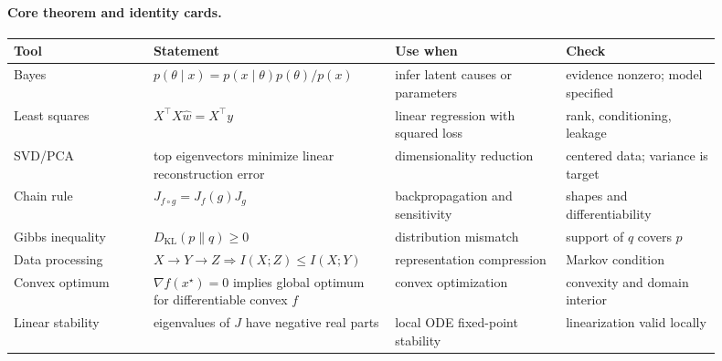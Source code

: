\paragraph{Core theorem and identity cards.}
\begin{center}
\small
\setlength{\tabcolsep}{2pt}
\renewcommand{\arraystretch}{1.12}
\begin{tabular}{p{0.18\linewidth}p{0.30\linewidth}p{0.22\linewidth}p{0.20\linewidth}}
\toprule
Tool & Statement & Use when & Check \\
\midrule
Bayes & \(p(\theta\mid x)=p(x\mid\theta)p(\theta)/p(x)\) & infer latent causes or parameters & evidence nonzero; model specified \\
Least squares & \(X^\top X\widehat w=X^\top y\) & linear regression with squared loss & rank, conditioning, leakage \\
SVD/PCA & top eigenvectors minimize linear reconstruction error & dimensionality reduction & centered data; variance is target \\
Chain rule & \(J_{f\circ g}=J_f(g)J_g\) & backpropagation and sensitivity & shapes and differentiability \\
Gibbs inequality & \(D_{\mathrm{KL}}(p\|q)\geq0\) & distribution mismatch & support of \(q\) covers \(p\) \\
Data processing & \(X\to Y\to Z\Rightarrow I(X;Z)\leq I(X;Y)\) & representation compression & Markov condition \\
Convex optimum & \(\nabla f(x^\star)=0\) implies global optimum for differentiable convex \(f\) & convex optimization & convexity and domain interior \\
Linear stability & eigenvalues of \(J\) have negative real parts & local ODE fixed-point stability & linearization valid locally \\
\bottomrule
\end{tabular}
\end{center}

